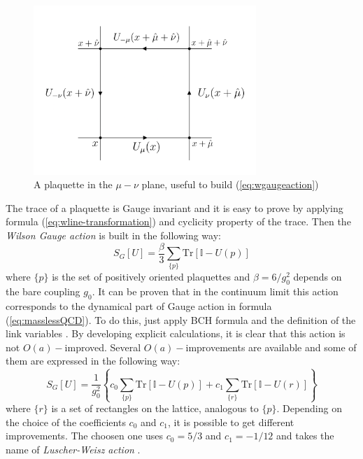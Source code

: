\documentclass[english, LaM, oneside, noexaminfo]{sapthesis}
\newcommand{\oaid}{$O(a)-$improved}
\newcommand{\tr}{\text{Tr}}
\begin{document}
\begin{figure}[h!]
    \centering
    \includegraphics[width=0.75\textwidth]{imgs-MSc-thesis/plaquette.png}
    \caption{A plaquette in the $\mu-\nu$ plane, useful to build (\ref{eq:wgaugeaction})}
    \label{fig:plaquette}
\end{figure}
The trace of a plaquette is Gauge invariant and it is easy to prove by applying formula (\ref{eq:wline-transformation}) and cyclicity property of the trace.
Then the \textit{Wilson Gauge action} is built in the following way:
\begin{equation}\label{eq:wgaugeaction}
    S_G[U] = \frac{\beta}{3}\sum_{\{p\}} \tr \left[ \mathbb{I} - U(p)\right]
\end{equation}
where $\{p\}$ is the set of positively oriented plaquettes and $\beta = 6/g_0^2$ depends on the bare coupling $g_0$.
It can be proven that in the continuum limit this action corresponds to the dynamical part of Gauge action in formula (\ref{eq:masslessQCD}).
To do this, just apply BCH formula and the definition of the link variables \cite{gattringer-lang}.
By developing explicit calculations, it is clear that this action is not \oaid.
\newline
Several $O(a)-$improvements are available and some of them are expressed in the following way:
\begin{equation}\label{eq:gaugeaction-LuscherWeisz}
    S_G[U] = \frac{1}{g_0^2} \left\{ c_0 \sum_{\{p\}} \tr \left[ \mathbb{I} - U(p)\right] + c_1 \sum_{\{r\}} \tr \left[ \mathbb{I} - U(r)\right] \right\}
\end{equation}
where $\{r\}$ is a set of rectangles on the lattice, analogous to $\{p\}$.
Depending on the choice of the coefficients $c_{0}$ and $c_{1}$, it is possible to get different improvements.
The choosen one uses $c_0 = 5/3$ and $c_1 = -1/12$ and takes the name of \textit{Luscher-Weisz action} \cite{tmLQCD}.
\end{document}
